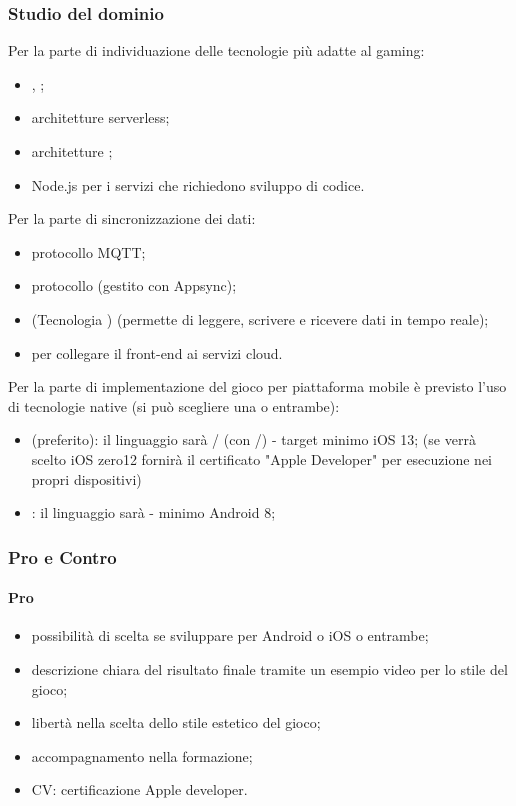 \subsubsection{Studio del dominio}
Per la parte di individuazione delle tecnologie più adatte al gaming:
\begin{itemize}
	\item {}, ;
	\item architetture serverless;
	\item architetture ;
	\item Node.js per i servizi che richiedono sviluppo di codice.
\end{itemize}
Per la parte di sincronizzazione dei dati:
\begin{itemize}
	\item protocollo MQTT;
	\item protocollo  (gestito con Appsync);
	\item {} (Tecnologia ) (permette di leggere, scrivere e ricevere dati in tempo reale);
	\item {} per collegare il front-end ai servizi cloud.
\end{itemize}
Per la parte di implementazione del gioco per piattaforma mobile è previsto l'uso di tecnologie native (si può scegliere una o entrambe):
\begin{itemize}
	\item {} (preferito): il linguaggio sarà / (con /) - target minimo iOS 13; (se verrà scelto iOS zero12 fornirà il certificato "Apple Developer" per esecuzione nei propri dispositivi)
	\item {}: il linguaggio sarà  - minimo Android 8;
\end{itemize}
\subsubsection{Pro e Contro}
\paragraph*{Pro}
\begin{itemize}
	\item possibilità di scelta se sviluppare per Android o iOS o entrambe;
	\item descrizione chiara del risultato finale tramite un esempio video per lo stile del gioco;
	\item libertà nella scelta dello stile estetico del gioco;
	\item accompagnamento nella formazione;
	\item CV: certificazione Apple developer.
\end{itemize}
